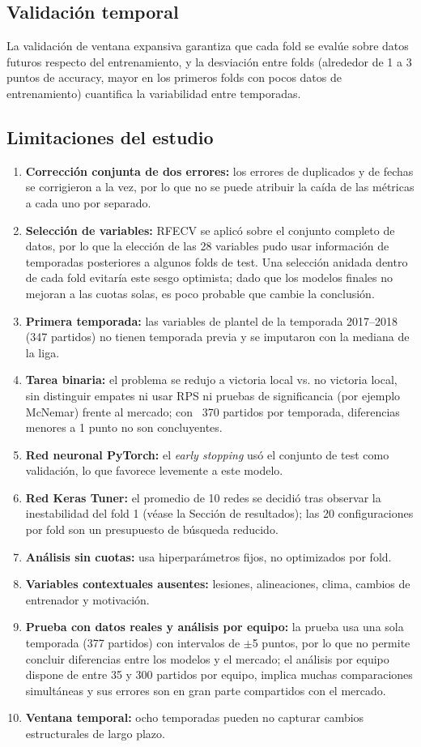 \documentclass{ieeeaccess}
\begin{document}
\subsection{Validación temporal}
La validación de ventana expansiva garantiza que cada fold se evalúe sobre datos futuros respecto del entrenamiento, y la desviación entre folds (alrededor de 1 a 3 puntos de accuracy, mayor en los primeros folds con pocos datos de entrenamiento) cuantifica la variabilidad entre temporadas.

\subsection{Limitaciones del estudio}
\begin{enumerate}
\item \textbf{Corrección conjunta de dos errores:} los errores de duplicados y de fechas se corrigieron a la vez, por lo que no se puede atribuir la caída de las métricas a cada uno por separado.
\item \textbf{Selección de variables:} RFECV se aplicó sobre el conjunto completo de datos, por lo que la elección de las 28 variables pudo usar información de temporadas posteriores a algunos folds de test. Una selección anidada dentro de cada fold evitaría este sesgo optimista; dado que los modelos finales no mejoran a las cuotas solas, es poco probable que cambie la conclusión.
\item \textbf{Primera temporada:} las variables de plantel de la temporada 2017--2018 (347 partidos) no tienen temporada previa y se imputaron con la mediana de la liga.
\item \textbf{Tarea binaria:} el problema se redujo a victoria local vs. no victoria local, sin distinguir empates ni usar RPS ni pruebas de significancia (por ejemplo McNemar) frente al mercado; con ~370 partidos por temporada, diferencias menores a 1 punto no son concluyentes.
\item \textbf{Red neuronal PyTorch:} el \textit{early stopping} usó el conjunto de test como validación, lo que favorece levemente a este modelo.
\item \textbf{Red Keras Tuner:} el promedio de 10 redes se decidió tras observar la inestabilidad del fold 1 (véase la Sección de resultados); las 20 configuraciones por fold son un presupuesto de búsqueda reducido.
\item \textbf{Análisis sin cuotas:} usa hiperparámetros fijos, no optimizados por fold.
\item \textbf{Variables contextuales ausentes:} lesiones, alineaciones, clima, cambios de entrenador y motivación.
\item \textbf{Prueba con datos reales y análisis por equipo:} la prueba usa una sola temporada (377 partidos) con intervalos de $\pm$5 puntos, por lo que no permite concluir diferencias entre los modelos y el mercado; el análisis por equipo dispone de entre 35 y 300 partidos por equipo, implica muchas comparaciones simultáneas y sus errores son en gran parte compartidos con el mercado.
\item \textbf{Ventana temporal:} ocho temporadas pueden no capturar cambios estructurales de largo plazo.
\end{enumerate}
\end{document}
